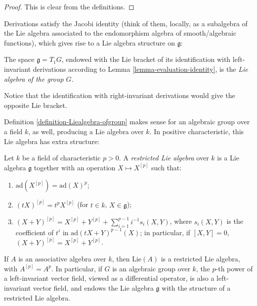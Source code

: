 \begin{proof}
 This is clear from the definitions.
\end{proof}

Derivations satisfy the Jacobi identity (think of them, locally, as a subalgebra of the Lie algebra associated to the endomorphism algebra of smooth/algebraic functions), which gives rise to a Lie algebra structure on $\mathfrak g$:

\begin{definition}
\label{definition-Liealgebra-ofgroup}
 The space $\mathfrak g= T_1 G$, endowed with the Lie bracket of its identification with left- invariant derivations according to Lemma \ref{lemma-evaluation-identity}, is the {\it Lie algebra of the group $G$}.
\end{definition}

Notice that the identification with right-invariant derivations would give the opposite Lie bracket. 

Definition \ref{definition-Liealgebra-ofgroup} makes sense for an algebraic group over a field $k$, as well, producing a Lie algebra over $k$. In positive characteristic, this Lie algebra has extra structure:

\begin{definition}
 \label{definition-restricted-Lie-algebra}
Let $k$ be a field of characteristic $p>0$. A {\it restricted Lie algebra} over $k$ is a Lie algebra $\mathfrak g$ together with an operation $X\mapsto X^{[p]}$ such that:
\begin{enumerate}
 \item $\text{ad}(X^{[p]}) = \text{ad}(X)^p$;
 \item $(tX)^{[p]} = t^p X^{[p]}$ (for $t\in k$, $X\in \mathfrak g$);
 \item $(X+Y)^{[p]} = X^{[p]} + Y^{[p]} +\sum_{i=1}^{p-1} i^{-1} s_i(X,Y)$, where $s_i(X,Y)$ is the coefficient of $t^i$ in $\text{ad}(tX+Y)^{p-1}(X)$; in particular, if $[X,Y]=0$, $(X+Y)^{[p]} = X^{[p]}+Y^{[p]}$. 
\end{enumerate}
\end{definition}

\begin{example}
 \label{example-restricted-Lie-algebra}
If $A$ is an associative algebra over $k$, then $\text{Lie}(A)$ is a restricted Lie algebra, with $A^{[p]}= A^p$. In particular, if $G$ is an algebraic group over $k$, the $p$-th power of a left-invariant vector field, viewed as a differential operator, is also a left-invariant vector field, and endows the Lie algebra $\mathfrak g$ with the structure of a restricted Lie algebra.
\end{example}




